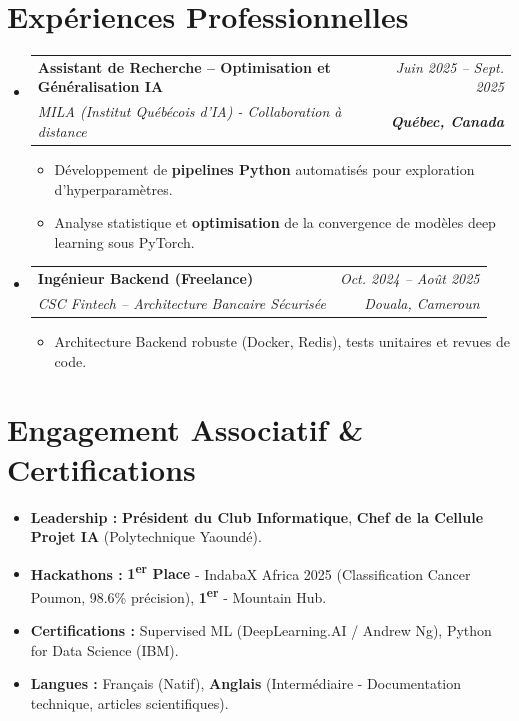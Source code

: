 \documentclass[a4paper,11pt]{article}
\makeatletter
\newcommand{\resumeSubheading}[4]{
  \vspace{-1pt}\item
    \begin{tabular*}{0.97\textwidth}[t]{l@{\extracolsep{\fill}}r}
      \textbf{#1} & \textit{\small #2} \\
      \textit{\small #3} & \textit{\small #4} \\
    \end{tabular*}\vspace{-5pt}
}
\makeatother
\begin{document}
\section{Expériences Professionnelles}
\begin{itemize}[leftmargin=*, label={}]

    \resumeSubheading
      {Assistant de Recherche -- Optimisation et Généralisation IA}{Juin 2025 -- Sept. 2025}
      {MILA (Institut Québécois d'IA) - Collaboration à distance}{\textbf{Québec, Canada}}
      \begin{itemize}[leftmargin=0.4cm, nosep, label=\tiny$\bullet$]
        \item \small{Développement de \textbf{pipelines Python} automatisés pour exploration d'hyperparamètres.}
        \item \small{Analyse statistique et \textbf{optimisation} de la convergence de modèles deep learning sous PyTorch.}
      \end{itemize}
    \vspace{2pt}

    \resumeSubheading
      {Ingénieur Backend (Freelance)}{Oct. 2024 -- Août 2025}
      {CSC Fintech -- Architecture Bancaire Sécurisée}{Douala, Cameroun}
      \begin{itemize}[leftmargin=0.4cm, nosep, label=\tiny$\bullet$]
        \item \small{Architecture Backend robuste (Docker, Redis), tests unitaires et revues de code.}
      \end{itemize}
\end{itemize}

\section{Engagement Associatif \& Certifications}
\begin{itemize}[leftmargin=*, nosep]
    \item \textbf{Leadership :} \textbf{Président du Club Informatique}, \textbf{Chef de la Cellule Projet IA} (Polytechnique Yaoundé).
    \item \textbf{Hackathons :} \textbf{1\textsuperscript{er} Place} - IndabaX Africa 2025 (Classification Cancer Poumon, 98.6\% précision), \textbf{1\textsuperscript{er}} - Mountain Hub.
    \item \textbf{Certifications :} Supervised ML (DeepLearning.AI / Andrew Ng), Python for Data Science (IBM).
    \item \textbf{Langues :} Français (Natif), \textbf{Anglais} (Intermédiaire - Documentation technique, articles scientifiques).
\end{itemize}
\end{document}
